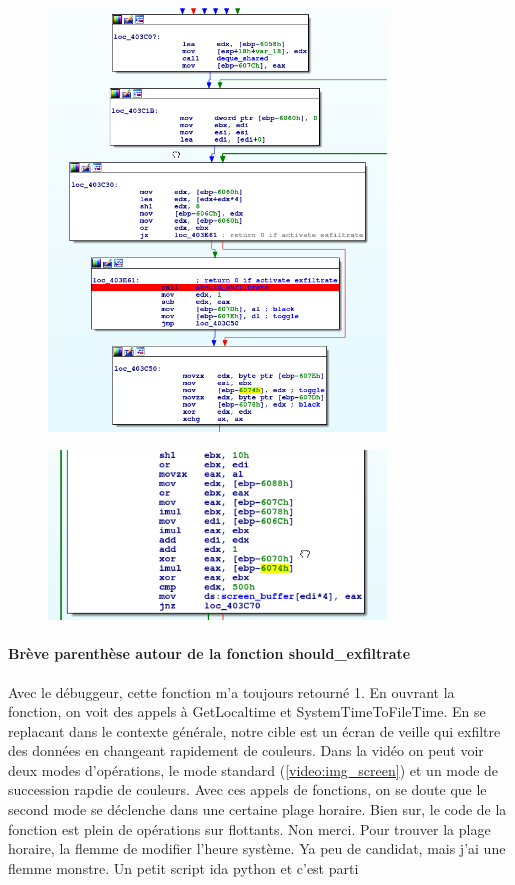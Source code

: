 \documentclass[14pt]{article}
\begin{document}
\begin{figure}[H]
\includegraphics[width=0.8\textwidth]{./imgs/video_final_logic.png}
\centering
\end{figure}

\begin{figure}[H]
\includegraphics[width=0.8\textwidth]{./imgs/video_final_logic2.png}
\centering
\end{figure}

\paragraph{Brève parenthèse autour de la fonction should\_exfiltrate}
  Avec le débuggeur, cette fonction m'a toujours retourné 1. En ouvrant la fonction, on voit des appels à GetLocaltime et SystemTimeToFileTime. En se replacant dans le contexte générale, notre cible est un écran de veille qui exfiltre des données en changeant rapidement de couleurs. Dans la vidéo on peut voir deux modes d'opérations, le mode standard (\ref{video:img_screen}) et un mode de succession rapdie de couleurs. Avec ces appels de fonctions, on se doute que le second mode se déclenche dans une certaine plage horaire. Bien sur, le code de la fonction est plein de opérations sur flottants. Non merci. Pour trouver la plage horaire, la flemme de modifier l'heure système. Ya peu de candidat, mais j'ai une flemme monstre. Un petit script ida python et c'est parti
\end{document}

